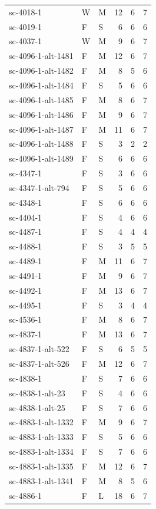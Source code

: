 \begin{longtable}{@{}p{}llrrr@{}}
sc-4018-1 & W & M & 12 & 6 & 7\\
sc-4019-1 & F & S & 6 & 6 & 6\\
sc-4037-1 & W & M & 9 & 6 & 7\\
sc-4096-1-alt-1481 & F & M & 12 & 6 & 7\\
sc-4096-1-alt-1482 & F & M & 8 & 5 & 6\\
sc-4096-1-alt-1484 & F & S & 5 & 6 & 6\\
sc-4096-1-alt-1485 & F & M & 8 & 6 & 7\\
sc-4096-1-alt-1486 & F & M & 9 & 6 & 7\\
sc-4096-1-alt-1487 & F & M & 11 & 6 & 7\\
sc-4096-1-alt-1488 & F & S & 3 & 2 & 2\\
sc-4096-1-alt-1489 & F & S & 6 & 6 & 6\\
sc-4347-1 & F & S & 3 & 6 & 6\\
sc-4347-1-alt-794 & F & S & 5 & 6 & 6\\
sc-4348-1 & F & S & 6 & 6 & 6\\
sc-4404-1 & F & S & 4 & 6 & 6\\
sc-4487-1 & F & S & 4 & 4 & 4\\
sc-4488-1 & F & S & 3 & 5 & 5\\
sc-4489-1 & F & M & 11 & 6 & 7\\
sc-4491-1 & F & M & 9 & 6 & 7\\
sc-4492-1 & F & M & 13 & 6 & 7\\
sc-4495-1 & F & S & 3 & 4 & 4\\
sc-4536-1 & F & M & 8 & 6 & 7\\
sc-4837-1 & F & M & 13 & 6 & 7\\
sc-4837-1-alt-522 & F & S & 6 & 5 & 5\\
sc-4837-1-alt-526 & F & M & 12 & 6 & 7\\
sc-4838-1 & F & S & 7 & 6 & 6\\
sc-4838-1-alt-23 & F & S & 4 & 6 & 6\\
sc-4838-1-alt-25 & F & S & 7 & 6 & 6\\
sc-4883-1-alt-1332 & F & M & 9 & 6 & 7\\
sc-4883-1-alt-1333 & F & S & 5 & 6 & 6\\
sc-4883-1-alt-1334 & F & S & 7 & 6 & 6\\
sc-4883-1-alt-1335 & F & M & 12 & 6 & 7\\
sc-4883-1-alt-1341 & F & M & 8 & 5 & 6\\
sc-4886-1 & F & L & 18 & 6 & 7\\

\end{longtable}
